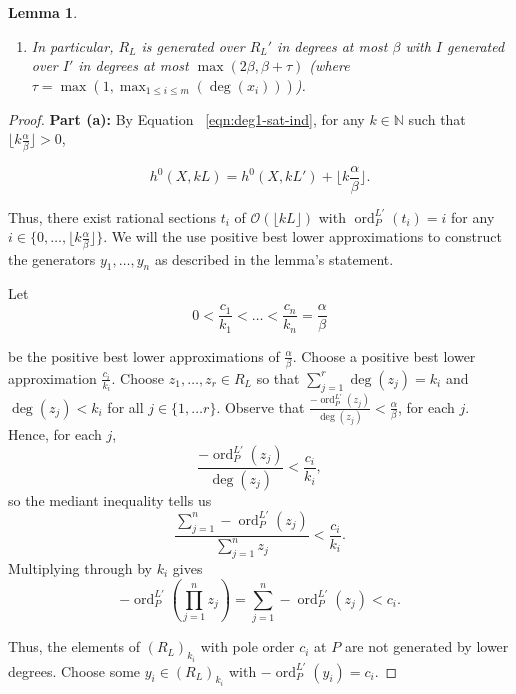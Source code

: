 \documentclass{amsart}
\theoremstyle{plain}
\newtheorem{lem}[thm]{Lemma}
\theoremstyle{definition}
\theoremstyle{remark}
\numberwithin{equation}{section}
\newcommand\BN{{\mathbb N}}
\newcommand\sco{{\mathscr O}}
\DeclareMathOperator{\ord}{ord}
\newcommand{\halfcan}{L}
\begin{document}
\begin{lem}
\begin{enumerate}
\item[(c)] In particular, $R_\halfcan$ is generated over $R_\halfcan'$
	in degrees at most $\beta$ with $I$ generated over $I'$ in
	degrees at most $\max(2 \beta, \beta + \tau)$ (where $\tau = \max(1,
	\max_{1 \leq i \leq m}(\deg(x_i)))$).
\end{enumerate}
\end{lem}

\begin{proof}
{\bf Part (a):}
By
Equation ~\ref{eqn:deg1-sat-ind}, for any $k
\in \BN$ such that $\lfloor k \frac{ \alpha}{\beta} \rfloor > 0$,

\[
	h^0 (X, k \halfcan ) = h^0(X, k \halfcan') + \lfloor k \frac{\alpha}{\beta}\rfloor.
\]

\noindent
Thus, there exist rational sections $t_i$ of $\sco(\lfloor k \halfcan \rfloor)$ with $\ord_P^{L'}(t_i) = i$
for any $i \in \{0, \ldots, \lfloor k \frac{\alpha}{
\beta} \rfloor \}$. We will the use positive best lower approximations to
construct the generators $y_1, \ldots, y_n$ as described in the lemma's statement.

Let 
\[
	0 < \frac{c_1}{k_1} < \ldots < \frac{c_n}{k_n} = \frac{\alpha}{
	\beta}
\]

\noindent
be the positive best lower approximations of $\frac{
\alpha}{\beta}$. 
Choose a positive best lower approximation $\frac{c_i}{k_i}$.  Choose $z_1, \ldots, z_r \in R_\halfcan$ so that $\sum_{j=1}^r \deg(z_j) = k_i$ and $\deg(z_j)<k_i$ for all $j\in \{1, \ldots r\}$. Observe that $\frac{-\ord_P^{\halfcan'}(z_j)}{\deg(z_j)}< \frac{\alpha}{\beta}$, for each $j$.  Hence, for each $j$, 
\[
	\frac{-\ord_P^{\halfcan'}(z_j)}{\deg(z_j)} < \frac{c_i}{k_i},
\]
so the mediant inequality tells us
\[
	\frac{\sum_{j=1}^n -\ord^{\halfcan'}_P(z_j)}{\sum_{j=1}^n z_j } < \frac{c_i}{k_i}.
\]
Multiplying through by $k_i$ gives
\[
	-\ord^{\halfcan'}_P \left(\prod_{j=1}^n z_j \right) = \sum_{j=1}^n -\ord^{\halfcan'}_P(z_j) < c_i .
\]

\noindent
Thus, the elements of $(R_{\halfcan})_{k_i}$ with pole order $c_i$ at $P$ are not generated by 
lower degrees. 
Choose some $y_i \in(R_{
\halfcan})_{k_i}$ with $-\ord_{P}^{L'}(y_i)=c_i$.


\end{proof}
\end{document}
